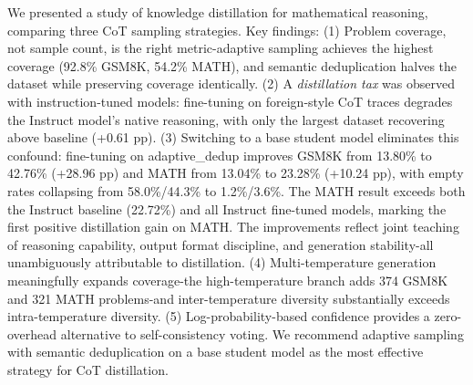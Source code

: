 \documentclass{article}
\begin{document}
We presented a study of knowledge distillation for mathematical reasoning, comparing three CoT sampling strategies. Key findings: (1) Problem coverage, not sample count, is the right metric-adaptive sampling achieves the highest coverage (92.8\% GSM8K, 54.2\% MATH), and semantic deduplication halves the dataset while preserving coverage identically. (2) A \textit{distillation tax} was observed with instruction-tuned models: fine-tuning on foreign-style CoT traces degrades the Instruct model's native reasoning, with only the largest dataset recovering above baseline (+0.61 pp). (3) Switching to a base student model eliminates this confound: fine-tuning on adaptive\_dedup improves GSM8K from 13.80\% to 42.76\% (+28.96 pp) and MATH from 13.04\% to 23.28\% (+10.24 pp), with empty rates collapsing from 58.0\%/44.3\% to 1.2\%/3.6\%. The MATH result exceeds both the Instruct baseline (22.72\%) and all Instruct fine-tuned models, marking the first positive distillation gain on MATH. The improvements reflect joint teaching of reasoning capability, output format discipline, and generation stability-all unambiguously attributable to distillation. (4) Multi-temperature generation meaningfully expands coverage-the high-temperature branch adds 374 GSM8K and 321 MATH problems-and inter-temperature diversity substantially exceeds intra-temperature diversity. (5) Log-probability-based confidence provides a zero-overhead alternative to self-consistency voting. We recommend adaptive sampling with semantic deduplication on a base student model as the most effective strategy for CoT distillation.
\end{document}
